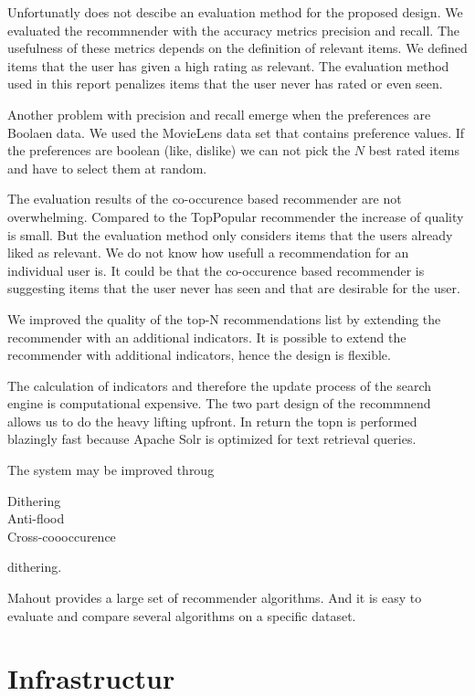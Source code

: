 \documentclass[twoside,a4paper]{article}
\begin{document}
Unfortunatly \cite{Dunning14} does not descibe an evaluation method for the proposed design. We evaluated the recommnender with the accuracy metrics precision and recall. The usefulness of these metrics depends on the definition of relevant items. We defined items that the user has given a high rating as relevant. The evaluation method used in this report penalizes items that the user never has rated or even seen. 

Another problem with precision and recall emerge when the preferences are Boolaen data. We used the MovieLens data set that contains preference values. If the preferences are boolean (like, dislike) we can not pick the $N$ best rated items and have to select them at random.

The evaluation results of the co-occurence based recommender are not overwhelming. Compared to the TopPopular recommender the increase of quality is small. But the evaluation method only considers items that the users already liked as relevant. We do not know how usefull a recommendation for an individual user is. It could be that the co-occurence based recommender is suggesting items that the user never has seen and that are desirable for the user.

We improved the quality of the top-N recommendations list by extending the recommender with an additional indicators. It is possible to extend the recommender with additional indicators, hence the design is flexible.

The calculation of indicators and therefore the update process of the search engine is computational expensive. The two part design of the recommnend allows us to do the heavy lifting upfront. In return the \gls{topn} is performed blazingly fast because Apache Solr is optimized for text retrieval queries. 

The system may be improved throug 
\begin{description}
\item[Dithering] 
\item[Anti-flood] 
\item[Cross-coooccurence]
\end{description}
dithering.

Mahout provides a large set of recommender algorithms. And it is easy to evaluate and compare several algorithms on a specific dataset.

\section{Infrastructur}
\label{sec:infrastructur}
\end{document}
